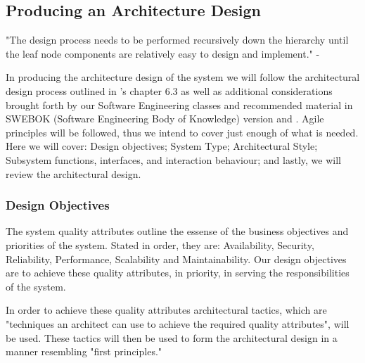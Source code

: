 \documentclass[11pt]{article}
\begin{document}
\subsection{Producing an Architecture Design}

"The design process needs to be performed recursively down the hierarchy until the leaf node components are relatively easy to design and implement." - \cite{Book:1}

In producing the architecture design of the system we will follow the architectural design process outlined in \cite{Book:1}'s chapter 6.3 as well as additional considerations brought forth by our Software Engineering classes and recommended material in SWEBOK (Software Engineering Body of Knowledge) version and \cite{Book:2}. Agile principles will be followed, thus we intend to cover just enough of what is needed. Here we will cover: Design objectives; System Type; Architectural Style; Subsystem functions, interfaces, and interaction behaviour; and lastly, we will review the architectural design.

\subsubsection{Design Objectives}

The system quality attributes outline the essense of the business objectives and priorities of the system. Stated in order, they are: Availability, Security, Reliability, Performance, Scalability and Maintainability. Our design objectives are to achieve these quality attributes, in priority, in serving the responsibilities of the system. 

In order to achieve these quality attributes architectural tactics, which are "techniques an architect can use to achieve the required quality attributes"\cite{Book:2}, will be used. These tactics will then be used to form the architectural design in a manner resembling "first principles." 
\end{document}
